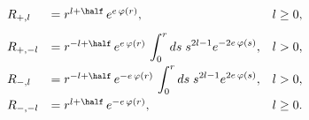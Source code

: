 \begin{equation}
\begin{array}{llr}
\label{Eq_0229}
R_{+,l} &= r^{l + \half} \, e^{e \, \varphi(r)},& l \geq 0,\\[3mm]
\displaystyle
R_{+,-l} &= r^{-l + \half} \, e^{e \, \varphi(r)} \,
  \displaystyle
  \int^r_0 ds \; s^{2l-1} e^{-2e \, \varphi(s)},& l > 0,\\[3mm]
R_{-,l} &= r^{-l + \half} \, e^{-e \, \varphi(r)} \,
  \displaystyle
  \int^r_0 ds \; s^{2l-1} e^{2e \, \varphi(s)},& l > 0,\\[3mm]
R_{-,-l} &= r^{l + \half} \,  e^{-e \, \varphi(r)},& l \geq 0.
\end{array}
\end{equation}

